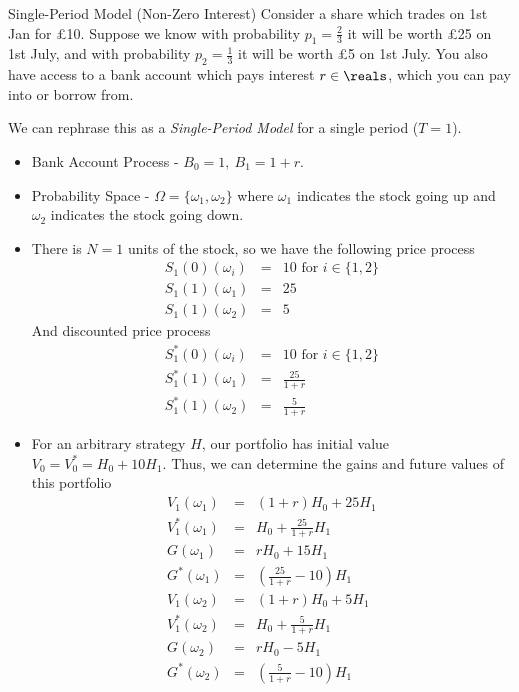 \documentclass[11pt,a4paper]{article}
\begin{document}
  \begin{example}{Single-Period Model (Non-Zero Interest)}
    Consider a share which trades on 1st Jan for £10. Suppose we know with probability $p_1=\frac23$ it will be worth £25 on 1st July, and with probability $p_2=\frac13$ it will be worth £5 on 1st July. You also have access to a bank account which pays interest $r\in\reals$, which you can pay into or borrow from.
    \par We can rephrase this as a \textit{Single-Period Model} for a single period ($T=1$).
    \begin{itemize}
      \item Bank Account Process - $B_0=1,\ B_1=1+r$.
      \item Probability Space - $\Omega=\{\omega_1,\omega_2\}$ where $\omega_1$ indicates the stock going up and $\omega_2$ indicates the stock going down.
      \item There is $N=1$ units of the stock, so we have the following price process
      \[\begin{array}{rcl}
        S_1(0)(\omega_i)&=&10\text{ for }i\in\{1,2\}\\
        S_1(1)(\omega_1)&=&25\\
        S_1(1)(\omega_2)&=&5
      \end{array}\]
      And discounted price process
      \[\begin{array}{rcl}
        S^*_1(0)(\omega_i)&=&10\text{ for }i\in\{1,2\}\\
        S^*_1(1)(\omega_1)&=&\frac{25}{1+r}\\
        S^*_1(1)(\omega_2)&=&\frac5{1+r}
      \end{array}\]
      \item For an arbitrary strategy $H$, our portfolio has initial value $V_0=V_0^*=H_0+10H_1$. Thus, we can determine the gains and future values of this portfolio
      \[\begin{array}{rcl}
        V_1(\omega_1)&=&(1+r)H_0+25H_1\\
        V_1^*(\omega_1)&=&H_0+\frac{25}{1+r}H_1\\
        G(\omega_1)&=&rH_0+15H_1\\
        G^*(\omega_1)&=&\left(\frac{25}{1+r}-10\right)H_1\\
        V_1(\omega_2)&=&(1+r)H_0+5H_1\\
        V_1^*(\omega_2)&=&H_0+\frac5{1+r}H_1\\
        G(\omega_2)&=&rH_0-5H_1\\
        G^*(\omega_2)&=&\left(\frac5{1+r}-10\right)H_1
      \end{array}\]
    \end{itemize}
  \end{example}
\end{document}
